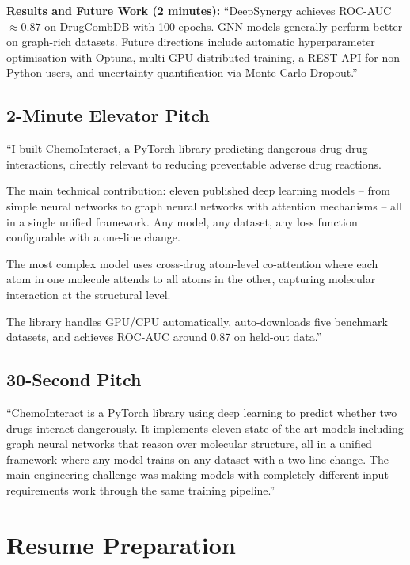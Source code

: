 \documentclass[12pt,a4paper,oneside]{book}
\begin{document}
\textbf{Results and Future Work (2 minutes):}
``DeepSynergy achieves ROC-AUC $\approx 0.87$ on DrugCombDB with 100 epochs. GNN models generally perform better on graph-rich datasets. Future directions include automatic hyperparameter optimisation with Optuna, multi-GPU distributed training, a REST API for non-Python users, and uncertainty quantification via Monte Carlo Dropout.''

\section{2-Minute Elevator Pitch}

``I built ChemoInteract, a PyTorch library predicting dangerous drug-drug interactions, directly relevant to reducing preventable adverse drug reactions.

The main technical contribution: eleven published deep learning models -- from simple neural networks to graph neural networks with attention mechanisms -- all in a single unified framework. Any model, any dataset, any loss function configurable with a one-line change.

The most complex model uses cross-drug atom-level co-attention where each atom in one molecule attends to all atoms in the other, capturing molecular interaction at the structural level.

The library handles GPU/CPU automatically, auto-downloads five benchmark datasets, and achieves ROC-AUC around 0.87 on held-out data.''

\section{30-Second Pitch}

``ChemoInteract is a PyTorch library using deep learning to predict whether two drugs interact dangerously. It implements eleven state-of-the-art models including graph neural networks that reason over molecular structure, all in a unified framework where any model trains on any dataset with a two-line change. The main engineering challenge was making models with completely different input requirements work through the same training pipeline.''

\chapter{Resume Preparation}\label{chap:resume}
\end{document}
